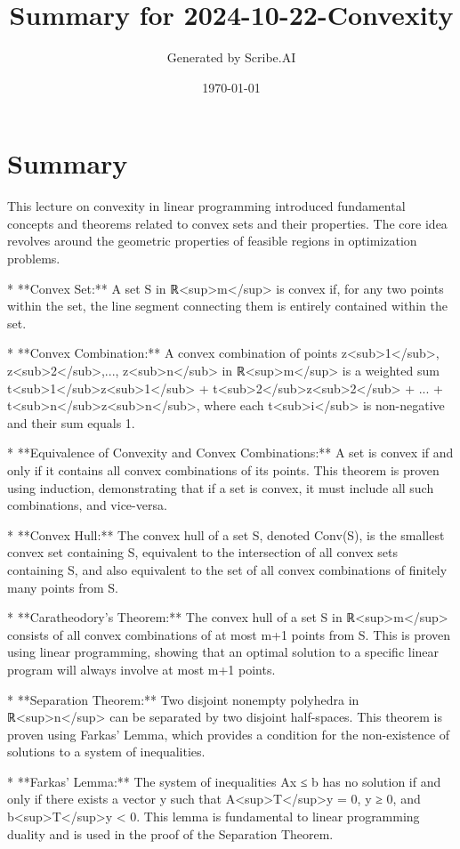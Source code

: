 \documentclass{article}%
\title{Summary for 2024{-}10{-}22{-}Convexity}%
\author{Generated by Scribe.AI}%
\date{\today}%
\begin{document}
%
\normalsize%
\maketitle%
\section{Summary}%
\label{sec:Summary}%
This lecture on convexity in linear programming introduced fundamental concepts and theorems related to convex sets and their properties.  The core idea revolves around the geometric properties of feasible regions in optimization problems.

* **Convex Set:** A set S in ℝ<sup>m</sup> is convex if, for any two points within the set, the line segment connecting them is entirely contained within the set.

* **Convex Combination:** A convex combination of points z<sub>1</sub>, z<sub>2</sub>,..., z<sub>n</sub> in ℝ<sup>m</sup> is a weighted sum  t<sub>1</sub>z<sub>1</sub> + t<sub>2</sub>z<sub>2</sub> + ... + t<sub>n</sub>z<sub>n</sub>, where each t<sub>i</sub> is non-negative and their sum equals 1.

* **Equivalence of Convexity and Convex Combinations:** A set is convex if and only if it contains all convex combinations of its points.  This theorem is proven using induction, demonstrating that if a set is convex, it must include all such combinations, and vice-versa.

* **Convex Hull:** The convex hull of a set S, denoted Conv(S), is the smallest convex set containing S, equivalent to the intersection of all convex sets containing S, and also equivalent to the set of all convex combinations of finitely many points from S.

* **Caratheodory's Theorem:** The convex hull of a set S in ℝ<sup>m</sup> consists of all convex combinations of at most m+1 points from S.  This is proven using linear programming, showing that an optimal solution to a specific linear program will always involve at most m+1 points.

* **Separation Theorem:** Two disjoint nonempty polyhedra in ℝ<sup>n</sup> can be separated by two disjoint half-spaces. This theorem is proven using Farkas' Lemma, which provides a condition for the non-existence of solutions to a system of inequalities.

* **Farkas' Lemma:** The system of inequalities Ax ≤ b has no solution if and only if there exists a vector y such that A<sup>T</sup>y = 0, y ≥ 0, and b<sup>T</sup>y < 0.  This lemma is fundamental to linear programming duality and is used in the proof of the Separation Theorem.

%
\end{document}
